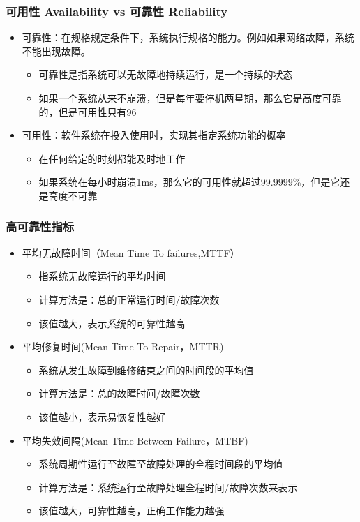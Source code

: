 \begin{frame}[fragile]
    \frametitle{可用性 Availability  vs 可靠性 Reliability}
\begin{itemize}
    \item 可靠性：在规格规定条件下，系统执行规格的能力。例如如果网络故障，系统不能出现故障。
   \begin{itemize}
    \item 可靠性是指系统可以无故障地持续运行，是一个持续的状态
    \item 如果一个系统从来不崩溃，但是每年要停机两星期，那么它是高度可靠的，但是可用性只有96%
   \end{itemize}
   \item 可用性：软件系统在投入使用时，实现其指定系统功能的概率
\begin{itemize}
    \item 在任何给定的时刻都能及时地工作
    \item 如果系统在每小时崩溃1ms，那么它的可用性就超过99.9999\%，但是它还是高度不可靠
\end{itemize}
\end{itemize}
\end{frame}


\begin{frame}[fragile]
    \frametitle{高可靠性指标}
\begin{itemize}
    \item 平均无故障时间（Mean Time To failures,MTTF） 
\begin{itemize}
    \item 指系统无故障运行的平均时间
    \item 计算方法是：总的正常运行时间/故障次数
    \item 该值越大，表示系统的可靠性越高
\end{itemize} \pause
    \item 平均修复时间(Mean Time To Repair，MTTR) 
 \begin{itemize}
    \item 系统从发生故障到维修结束之间的时间段的平均值
    \item 计算方法是：总的故障时间/故障次数
    \item 该值越小，表示易恢复性越好
\end{itemize}  \pause
 \item 平均失效间隔(Mean Time Between Failure，MTBF) 
 \begin{itemize}
    \item 系统周期性运行至故障至故障处理的全程时间段的平均值
    \item 计算方法是：系统运行至故障处理全程时间/故障次数来表示
    \item 该值越大，可靠性越高，正确工作能力越强
\end{itemize}  
\end{itemize}
\end{frame}





